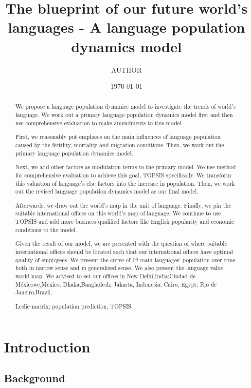 \documentclass{mcmthesis}
\title{The blueprint of our future world's languages - \newline A language population dynamics model  }
\author{AUTHOR}
\date{\today}
\begin{document}
\begin{abstract}
We propose a language population dynamics model to investigate the trends of world's language.
We work out a primary language population dynamics model first and then use comprehensive evaluation to make amendments to this model.


First, we reasonably put emphasis on the main influences of language population caused by the fertility, mortality and migration conditions. Then, we work out the primary language population dynamics model.


Next, we add other factors as modulation terms to the primary model. We use method for comprehensive evaluation to achieve this goal, TOPSIS specifically. We transform this valuation of language's else factors into the increase in population. Then, we work out the revised language population dynamics model as our final model.


Afterwards, we draw out the world's map in the unit of language.
Finally, we pin the suitable international offices on this world's map of language. We continue to use TOPSIS and add more business qualified factors like English popularity and economic conditions to the model.


Given the result of our model, we are presented with the question of where suitable international offices should be located such that our international offices have optimal quality of employees.
We present the curve of 12 main languages' population over time both in narrow sense and in generalized sense. We also present the language value world map. We advised to set our offices in New Delhi,India;Ciudad de Méxicowe,Mexico; Dhaka,Bangladesh; Jakarta, Indonesia; Cairo, Egypt; Rio de Janeiro,Brazil.

\begin{keywords}

Leslie matrix; population prediction; TOPSIS


\end{keywords}
\end{abstract}
\maketitle
\tableofcontents
\newpage
\section{Introduction}
\subsection{Background}
\end{document}
